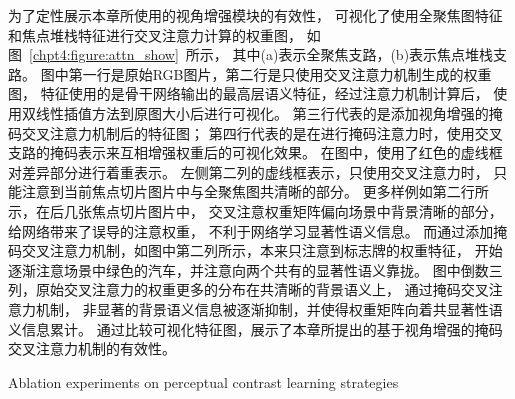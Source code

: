 为了定性展示本章所使用的视角增强模块的有效性，
可视化了使用全聚焦图特征和焦点堆栈特征进行交叉注意力计算的权重图，
如图~\ref{chpt4:figure:attn_show}~所示，
其中(a)表示全聚焦支路，(b)表示焦点堆栈支路。
图中第一行是原始RGB图片，第二行是只使用交叉注意力机制生成的权重图，
特征使用的是骨干网络输出的最高层语义特征，经过注意力机制计算后，
使用双线性插值方法到原图大小后进行可视化。
第三行代表的是添加视角增强的掩码交叉注意力机制后的特征图；
第四行代表的是在进行掩码注意力时，使用交叉支路的掩码表示来互相增强权重后的可视化效果。
在图中，使用了红色的虚线框对差异部分进行着重表示。
左侧第二列的虚线框表示，只使用交叉注意力时，
只能注意到当前焦点切片图片中与全聚焦图共清晰的部分。
更多样例如第二行所示，在后几张焦点切片图片中，
交叉注意权重矩阵偏向场景中背景清晰的部分，给网络带来了误导的注意权重，
不利于网络学习显著性语义信息。
而通过添加掩码交叉注意力机制，如图中第二列所示，本来只注意到标志牌的权重特征，
开始逐渐注意场景中绿色的汽车，并注意向两个共有的显著性语义靠拢。
图中倒数三列，原始交叉注意力的权重更多的分布在共清晰的背景语义上，
通过掩码交叉注意力机制，
非显著的背景语义信息被逐渐抑制，并使得权重矩阵向着共显著性语义信息累计。
通过比较可视化特征图，展示了本章所提出的基于视角增强的掩码交叉注意力机制的有效性。





\begin{table}[!ht]
	{Ablation experiments on perceptual contrast learning strategies}
	\centering
	\label{chpt4:tab:abl_loss}
\end{table}


